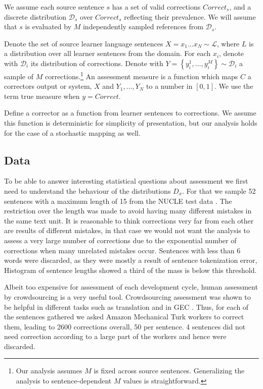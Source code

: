 \documentclass[letter,11pt]{article}
\begin{document}
We assume each source sentence $s$ has a set of valid corrections $Correct_s$,
and a discrete distribution $\mathcal{D}_s$ over $Correct_s$ reflecting their prevalence.
We will assume that $s$ is evaluated by
$M$ independently sampled references from $\mathcal{D}_s$.

Denote the set of source learner language sentences $X=x_{1}\ldots x_N \sim \mathcal{L}$, where
$L$ is a distribution over all learner sentences from the domain. For each $x_i$, denote
with $\mathcal{D}_{i}$ its distribution of corrections.
Denote with $Y = \left\{y_{i}^{1},\ldots, y_{i}^{M}\right\} \sim \mathcal{D}_{i}$
a sample of $M$ corrections.\footnote{Our analysis assumes $M$ is fixed across source sentences.
  Generalizing the analysis to sentence-dependent $M$ values is straightforward.}
An assessment measure is a function which maps $C$ a correctors output or system, $X$ and $Y_1,\ldots,Y_N$ to
a number in $[0,1]$. We use the term true measure when $y=Correct$.

Define a corrector as a function from learner sentences to corrections.
We assume this function is deterministic for simplicity of presentation,
but our analysis holds for the case of a stochastic mapping as well.


\subsection{Data}

To be able to answer interesting statistical questions about assessment we first
need to understand the behaviour of the distributions $D_x$. For that we sample
52 sentences with a maximum length of 15 from the NUCLE test data
. The restriction over the length was made to avoid having many different mistakes in the same text unit. It is reasonable to think corrections very far from each other are results of different mistakes, in that case we would not want the analysis to assess a very large number of corrections due to the exponential number of corrections when many unrelated mistakes occur.
Sentences with less than 6 words were discarded, as they were mostly a result of sentence tokenization error,
Histogram of sentence lengths showed a third of the mass is below this threshold.

Albeit too expensive for assessment of each development cycle, human assessment
by crowdsourcing is a very useful tool. Crowdsourcing assessment was shown to
be helpful in different tasks such as translation
\cite{zaidan2011crowdsourcing,post2012constructing}
and in GEC \cite{madnani2011they}. %
Thus, for each of the sentences gathered we asked Amazon Mechanical Turk workers to correct them, leading to 2600 corrections overall,
50 per sentence. 4 sentences did not need correction according to a large part of the workers and hence were discarded.
\end{document}
